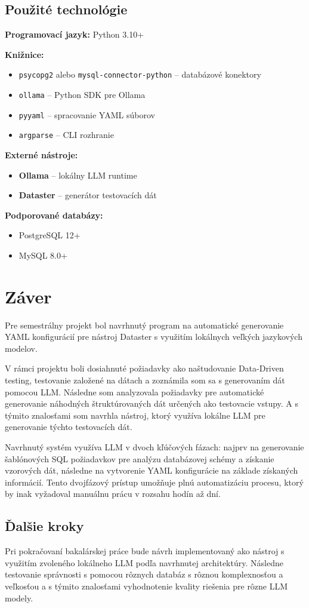 \section{Použité technológie }

\textbf{Programovací jazyk:} Python 3.10+


\textbf{Knižnice:}
\begin{itemize}
\item \texttt{psycopg2} alebo \texttt{mysql-connector-python} -- databázové konektory
\item \texttt{ollama} -- Python SDK pre Ollama
\item \texttt{pyyaml} -- spracovanie YAML súborov
\item \texttt{argparse} -- CLI rozhranie
\end{itemize}

\textbf{Externé nástroje:}
\begin{itemize}
\item \textbf{Ollama} -- lokálny LLM runtime
\item \textbf{Dataster} -- generátor testovacích dát
\end{itemize}

\textbf{Podporované databázy:}
\begin{itemize}
\item PostgreSQL 12+
\item MySQL 8.0+
\end{itemize}


\chapter{Záver}

Pre semestrálny projekt bol navrhnutý program na automatické generovanie YAML konfigurácií pre nástroj Dataster s využitím lokálnych veľkých jazykových modelov.

V rámci projektu boli dosiahnuté požiadavky ako naštudovanie Data-Driven testing, testovanie založené na dátach a zoznámila som sa s generovaním dát pomocou LLM. Následne som analyzovala požiadavky pre automatické generovanie náhodných štruktúrovaných dát určených ako testovacie vstupy. A s týmito znalosťami som navrhla nástroj, ktorý využíva lokálne LLM pre generovanie týchto testovacích dát.

Navrhnutý systém využíva LLM v dvoch kľúčových fázach: najprv na generovanie šablónových SQL požiadavkov pre analýzu databázovej schémy a získanie vzorových dát, následne na vytvorenie YAML konfigurácie na základe získaných informácií. Tento dvojfázový prístup umožňuje plnú automatizáciu procesu, ktorý by inak vyžadoval manuálnu prácu v rozsahu hodín až dní.

\section{Ďalšie kroky}

Pri pokračovaní bakalárskej práce bude návrh implementovaný ako nástroj s využitím zvoleného lokálneho LLM podľa navrhnutej architektúry. Následne testovanie správnosti s pomocou rôznych databáz s rôznou komplexnosťou a veľkosťou a s týmito znalosťami vyhodnotenie kvality riešenia pre rôzne LLM modely.